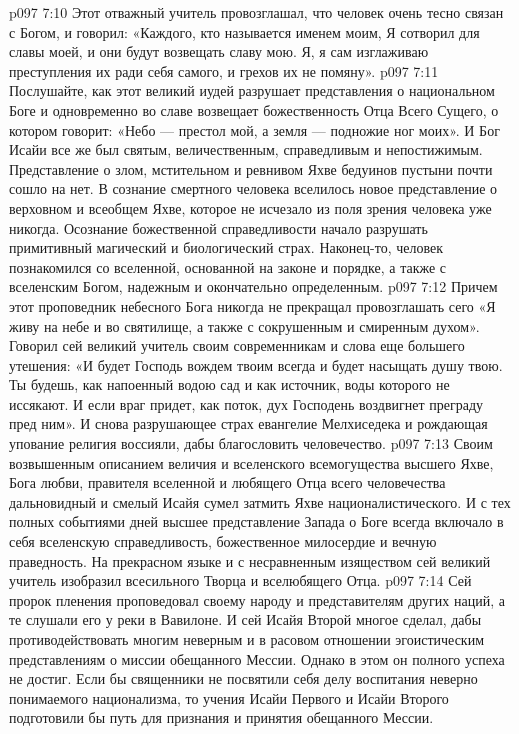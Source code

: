 \vs p097 7:10 Этот отважный учитель провозглашал, что человек очень тесно связан с Богом, и говорил: «Каждого, кто называется именем моим, Я сотворил для славы моей, и они будут возвещать славу мою. Я, я сам изглаживаю преступления их ради себя самого, и грехов их не помяну».
\vs p097 7:11 Послушайте, как этот великий иудей разрушает представления о национальном Боге и одновременно во славе возвещает божественность Отца Всего Сущего, о котором говорит: «Небо --- престол мой, а земля --- подножие ног моих». И Бог Исайи все же был святым, величественным, справедливым и непостижимым. Представление о злом, мстительном и ревнивом Яхве бедуинов пустыни почти сошло на нет. В сознание смертного человека вселилось новое представление о верховном и всеобщем Яхве, которое не исчезало из поля зрения человека уже никогда. Осознание божественной справедливости начало разрушать примитивный магический и биологический страх. Наконец\hyp{}то, человек познакомился со вселенной, основанной на законе и порядке, а также с вселенским Богом, надежным и окончательно определенным.
\vs p097 7:12 Причем этот проповедник небесного Бога никогда не прекращал провозглашать сего  «Я живу на небе и во святилище, а также с сокрушенным и смиренным духом». Говорил сей великий учитель своим современникам и слова еще большего утешения: «И будет Господь вождем твоим всегда и будет насыщать душу твою. Ты будешь, как напоенный водою сад и как источник, воды которого не иссякают. И если враг придет, как поток, дух Господень воздвигнет преграду пред ним». И снова разрушающее страх евангелие Мелхиседека и рождающая упование религия воссияли, дабы благословить человечество.
\vs p097 7:13 Своим возвышенным описанием величия и вселенского всемогущества высшего Яхве, Бога любви, правителя вселенной и любящего Отца всего человечества дальновидный и смелый Исайя сумел затмить Яхве националистического. И с тех полных событиями дней высшее представление Запада о Боге всегда включало в себя вселенскую справедливость, божественное милосердие и вечную праведность. На прекрасном языке и с несравненным изяществом сей великий учитель изобразил всесильного Творца и вселюбящего Отца.
\vs p097 7:14 Сей пророк пленения проповедовал своему народу и представителям других наций, а те слушали его у реки в Вавилоне. И сей Исайя Второй многое сделал, дабы противодействовать многим неверным и в расовом отношении эгоистическим представлениям о миссии обещанного Мессии. Однако в этом он полного успеха не достиг. Если бы священники не посвятили себя делу воспитания неверно понимаемого национализма, то учения Исайи Первого и Исайи Второго подготовили бы путь для признания и принятия обещанного Мессии.
